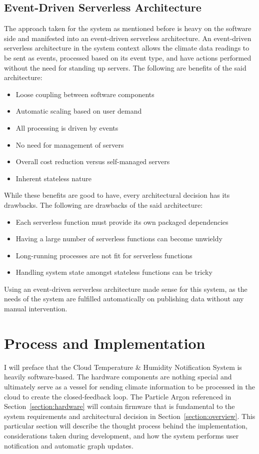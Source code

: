 \documentclass{article}
\begin{document}
\subsection{Event-Driven Serverless Architecture}
\label{section:architecture}
The approach taken for the system as mentioned before is heavy on the software side and manifested into an event-driven serverless architecture. An event-driven serverless architecture in the system context allows the climate data readings to be sent as events, processed based on its event type, and have actions performed without the need for standing up servers. The following are benefits of the said architecture:

\begin{itemize}
	\setlength{\itemindent}{.3in}
	\item Loose coupling between software components
	\item Automatic scaling based on user demand
	\item All processing is driven by events
	\item No need for management of servers
	\item Overall cost reduction versus self-managed servers
	\item Inherent stateless nature
\end{itemize}

While these benefits are good to have, every architectural decision has its drawbacks. The following  are drawbacks of the said architecture:

\begin{itemize}
	\setlength{\itemindent}{.3in}
	\item Each serverless function must provide its own packaged dependencies
	\item Having a large number of serverless functions can become unwieldy
	\item Long-running processes are not fit for serverless functions
	\item Handling system state amongst stateless functions can be tricky
\end{itemize}

Using an event-driven serverless architecture made sense for this system, as the needs of the system are fulfilled automatically on publishing data without any manual intervention.

\section{Process and Implementation}
\label{section:process}
I will preface that the Cloud Temperature \& Humidity Notification System is heavily software-based. The hardware components are nothing special and ultimately serve as a vessel for sending climate information to be processed in the cloud to create the closed-feedback loop. The Particle Argon referenced in Section~\ref{section:hardware} will contain firmware that is fundamental to the system requirements and architectural decision in Section~\ref{section:overview}. This particular section will describe the thought process behind the implementation, considerations taken during development, and how the system performs user notification and automatic graph updates.
\end{document}
